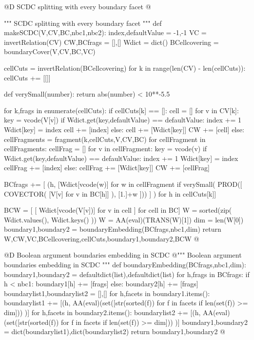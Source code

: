 \documentclass[11pt,oneside]{article}	%
\begin{document}
@D SCDC splitting with every boundary facet
@{""" SCDC splitting with every boundary facet """
def makeSCDC(V,CV,BC,nbc1,nbc2):
	index,defaultValue = -1,-1
	VC = invertRelation(CV)
	CW,BCfrags = [],[]
	Wdict = dict()
	BCellcovering = boundaryCover(V,CV,BC,VC)

	cellCuts = invertRelation(BCellcovering)
	for k in range(len(CV) - len(cellCuts)): cellCuts += [[]]
	
	def verySmall(number): return abs(number) < 10**-5.5
	
	for k,frags in enumerate(cellCuts):
		if cellCuts[k] == []:
			cell = []
			for v in CV[k]:
				key = vcode(V[v])
				if Wdict.get(key,defaultValue) == defaultValue:
					index += 1
					Wdict[key] = index
					cell += [index]
				else: 
					cell += [Wdict[key]]
			CW += [cell]
		else:
			cellFragments = fragment(k,cellCuts,V,CV,BC)
			for cellFragment in cellFragments:
				cellFrag = []
				for v in cellFragment:
					key = vcode(v)
					if Wdict.get(key,defaultValue) == defaultValue:
						index += 1
						Wdict[key] = index
						cellFrag += [index]
					else: 
						cellFrag += [Wdict[key]]
				CW += [cellFrag]	
				
				BCfrags += [ (h, [Wdict[vcode(w)] for w in cellFragment if verySmall( 
								PROD([ COVECTOR( [V[v] for v in BC[h]] ), [1.]+w ])) ] )
							 for h in cellCuts[k]]	
	
	BCW = [ [ Wdict[vcode(V[v])] for v in cell ] for cell in BC]
	W = sorted(zip( Wdict.values(), Wdict.keys() ))
	W = AA(eval)(TRANS(W)[1])
	dim = len(W[0])
	boundary1,boundary2 = boundaryEmbedding(BCfrags,nbc1,dim)
	return W,CW,VC,BCellcovering,cellCuts,boundary1,boundary2,BCW
@}

@D Boolean argument boundaries embedding in SCDC
@{""" Boolean argument boundaries embedding in SCDC """
def boundaryEmbedding(BCfrags,nbc1,dim):
	boundary1,boundary2 = defaultdict(list),defaultdict(list)						 
	for h,frags in BCfrags:
		if h < nbc1: boundary1[h] += [frags]
		else: boundary2[h] += [frags]	
	boundarylist1,boundarylist2 = [],[]
	for h,facets in boundary1.items():
		boundarylist1 += [(h, AA(eval)(set([str(sorted(f)) 
							for f in facets if len(set(f)) >= dim])) )]
	for h,facets in boundary2.items():
		boundarylist2 += [(h, AA(eval)(set([str(sorted(f)) 
							for f in facets if len(set(f)) >= dim])) )]
	boundary1,boundary2 = dict(boundarylist1),dict(boundarylist2)
	return boundary1,boundary2
@}
\end{document}
